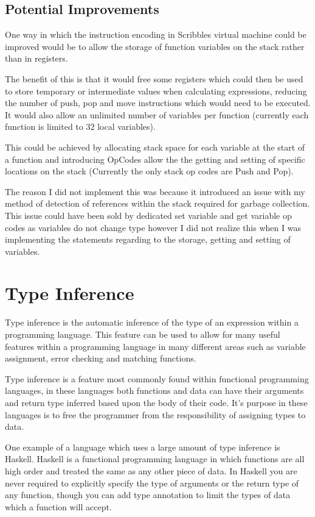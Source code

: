 \documentclass[]{final_report}
\begin{document}
\section{Potential Improvements}

One way in which the instruction encoding in Scribbles virtual machine could be improved would be to allow the storage of function variables on the stack rather than in registers.

The benefit of this is that it would free some registers which could then be used to store temporary or intermediate values when calculating expressions, reducing the number of push, pop and move instructions which would need to be executed. It would also allow an unlimited number of variables per function (currently each function is limited to 32 local variables).

This could be achieved by allocating stack space for each variable at the start of a function and introducing OpCodes allow the the getting and setting of specific locations on the stack (Currently the only stack op codes are Push and Pop).

The reason I did not implement this was because it introduced an issue with my method of detection of references within the stack required for garbage collection. This issue could have been sold by dedicated set variable and get variable op codes as variables do not change type however I did not realize this when I was implementing the statements regarding to the storage, getting and setting of variables.

\chapter{Type Inference}

Type inference is the automatic inference of the type of an expression within a programming language. This feature can be used to allow for many useful features within a programming language in many different areas such as variable assignment, error checking and matching functions.

Type inference is a feature most commonly found within functional programming languages, in these languages both functions and data can have their arguments and return type inferred based upon the body of their code. It's purpose in these languages is to free the programmer from the responsibility of assigning types to data.

One example of a language which uses a large amount of type inference is Haskell. Haskell is a functional programming language in which functions are all high order and treated the same as any other piece of data. In Haskell you are never required to explicitly specify the type of arguments or the return type of any function, though you can add type annotation to limit the types of data which a function will accept.
\end{document}
